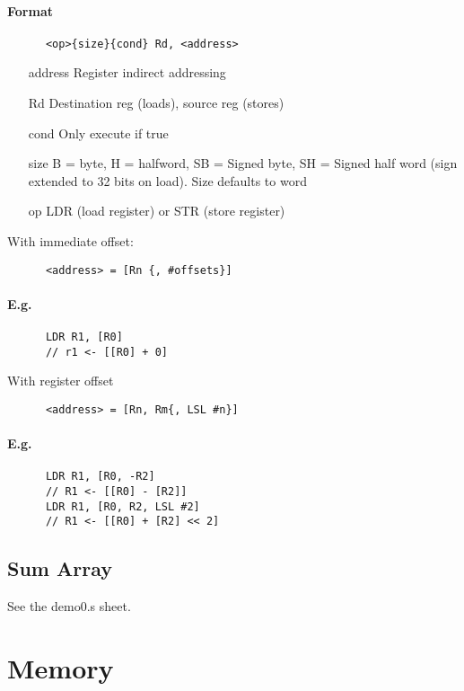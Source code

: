 \documentclass[12pt]{report}
\begin{document}
    \paragraph{Format}
    \begin{lstlisting}
      <op>{size}{cond} Rd, <address>
    \end{lstlisting}
    \begin{itemize}
      \item[address] Register indirect addressing
      \item[Rd] Destination reg (loads), source reg (stores)
      \item[cond] Only execute if true
      \item[size] B = byte, H = halfword, SB = Signed byte, SH = Signed half
      word (sign extended to 32 bits on load). Size defaults to word
      \item[op] LDR (load register) or STR (store register)
    \end{itemize}
    With immediate offset:
    \begin{lstlisting}
      <address> = [Rn {, #offsets}]
    \end{lstlisting}
    \paragraph{E.g.}
    \begin{lstlisting}
      LDR R1, [R0]
      // r1 <- [[R0] + 0]
    \end{lstlisting}
    With register offset
    \begin{lstlisting}
      <address> = [Rn, Rm{, LSL #n}]
    \end{lstlisting}
    \paragraph{E.g.}
    \begin{lstlisting}
      LDR R1, [R0, -R2]
      // R1 <- [[R0] - [R2]]
      LDR R1, [R0, R2, LSL #2]
      // R1 <- [[R0] + [R2] << 2]
    \end{lstlisting}

  \subsection{Sum Array}
    See the demo0.s sheet.


\section{Memory}
\end{document}
